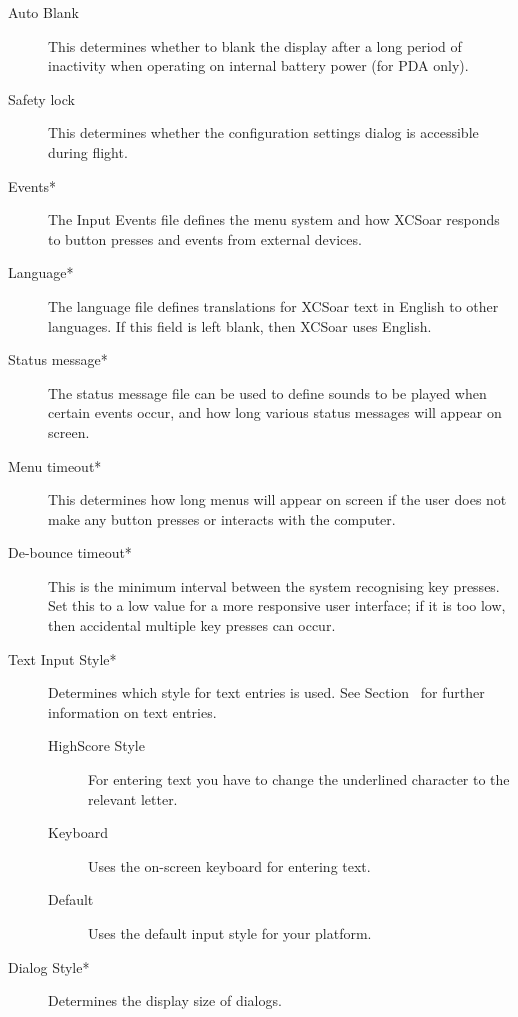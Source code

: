\documentclass[a4paper,12pt]{refrep}
\begin{document}
\begin{description}
\item[Auto Blank] This determines whether to blank the display after a long period 
of inactivity when operating on internal battery power (for PDA only).
\item[Safety lock]
This determines whether the configuration settings dialog is
accessible during flight.
\item[Events*]
The Input Events file defines the menu system and how XCSoar responds
to button presses and events from external devices.
\item[Language*]
The language file defines translations for XCSoar text in English to
other languages.  If this field is left blank,  then XCSoar uses English.
\item[Status message*]
The status message file can be used to define sounds to be played when certain
events occur, and how long various status messages will appear on screen.
\item[Menu timeout*]
This determines how long menus will appear on screen if the user
does not make any button presses or interacts with the computer.
\item[De-bounce timeout*]
This is the minimum interval between the system recognising key presses. 
Set this to a low value for a more responsive user interface; if
it is too low, then accidental multiple key presses can occur.
\item[Text Input Style*] Determines which style for text entries is used. See Section~ for further information on text entries.
\begin{description}
\item[HighScore Style] For entering text you have to change the underlined character to the relevant letter.
\item[Keyboard] Uses the on-screen keyboard for entering text.
\item[Default] Uses the default input style for your platform.
\end{description}
\item[Dialog Style*] Determines the display size of dialogs.
\end{description}
\end{document}
